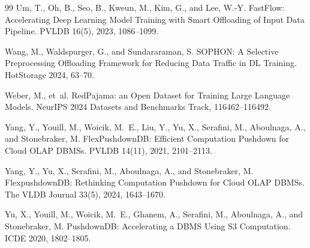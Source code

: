 \documentclass[11pt]{article}
\begin{document}
\begin{thebibliography}{99}
 Um, T., Oh, B., Seo, B., Kweun, M., Kim, G., and Lee, W.-Y. FastFlow: Accelerating Deep Learning Model Training with Smart Offloading of Input Data Pipeline. PVLDB 16(5), 2023, 1086--1099.

 Wang, M., Waldspurger, G., and Sundararaman, S. SOPHON: A Selective Preprocessing Offloading Framework for Reducing Data Traffic in DL Training. HotStorage 2024, 63--70.

 Weber, M., et~al. RedPajama: an Open Dataset for Training Large Language Models. NeurIPS 2024 Datasets and Benchmarks Track, 116462--116492.

 Yang, Y., Youill, M., Woicik, M.~E., Liu, Y., Yu, X., Serafini, M., Aboulnaga, A., and Stonebraker, M. FlexPushdownDB: Efficient Computation Pushdown for Cloud OLAP DBMSs. PVLDB 14(11), 2021, 2101--2113.

 Yang, Y., Yu, X., Serafini, M., Aboulnaga, A., and Stonebraker, M. FlexpushdownDB: Rethinking Computation Pushdown for Cloud OLAP DBMSs. The VLDB Journal 33(5), 2024, 1643--1670.

 Yu, X., Youill, M., Woicik, M.~E., Ghanem, A., Serafini, M., Aboulnaga, A., and Stonebraker, M. PushdownDB: Accelerating a DBMS Using S3 Computation. ICDE 2020, 1802--1805.

\end{thebibliography}
\end{document}
